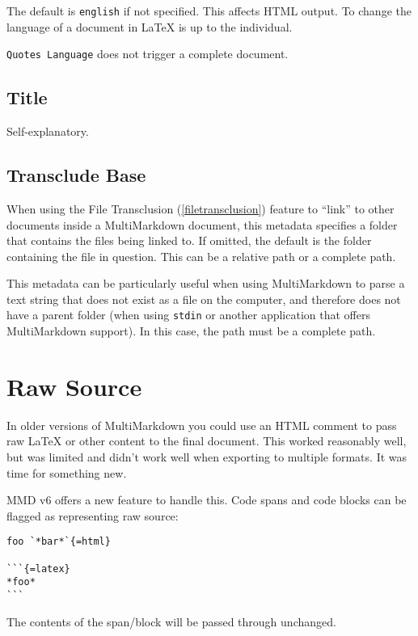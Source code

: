 The default is \texttt{english} if not specified. This affects HTML output. To
change the language of a document in LaTeX is up to the individual.

\texttt{Quotes Language} does not trigger a complete document.

\subsection{Title}
\label{title}

Self-explanatory.

\subsection{Transclude Base}
\label{transcludebase}

When using the File Transclusion (\autoref{filetransclusion}) feature to ``link'' to other documents inside a MultiMarkdown document, this metadata specifies a folder that contains the files being linked to. If omitted, the default is the folder containing the file in question. This can be a relative path or a complete path.

This metadata can be particularly useful when using MultiMarkdown to parse a text string that does not exist as a file on the computer, and therefore does not have a parent folder (when using \texttt{stdin} or another application that offers MultiMarkdown support). In this case, the path must be a complete path.

\section{Raw Source}
\label{rawsource}

In older versions of MultiMarkdown you could use an HTML comment to pass raw LaTeX or other content to the final document. This worked reasonably well, but was limited and didn't work well when exporting to multiple formats. It was time for something new.

\gls{MMD} v6 offers a new feature to handle this. Code spans and code blocks can be flagged as representing raw source:

\begin{verbatim}
foo `*bar*`{=html}

```{=latex}
*foo*
```
\end{verbatim}

The contents of the span\slash{}block will be passed through unchanged.

